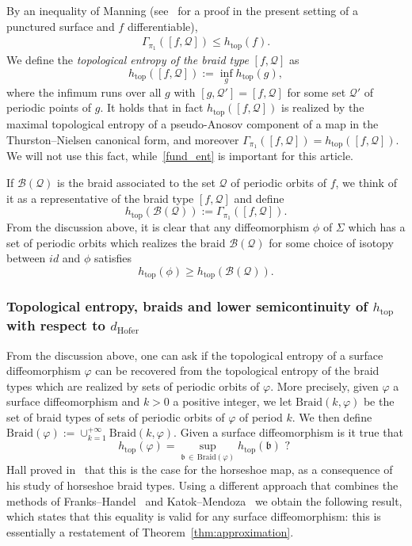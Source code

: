 \documentclass[AHL,Unicode,longabstracts,published]{cedram}
\newcommand{\id}{id}
\newcommand{\topo}{\mathrm{top}}
\newcommand{\hofer}{\mathrm{Hofer}}
\newcommand{\Braid}{\mathrm{Braid}}
\newcommand{\clB}{\mathcal{B}}
\newcommand{\clQ}{\mathcal{Q}}
\newcommand{\fkb}{\mathfrak{b}}
\newcommand{\topo}{\mathrm{top}}
\newcommand{\hofer}{\mathrm{Hofer}}
\begin{document}
By an inequality of Manning (see~\cite{Bowen} for a proof in the present setting of a punctured surface and $f$ differentiable),
\begin{align}\label{fund_ent}
\Gamma_{\pi_1}([f,\clQ]) \leq h_{\topo}(f).
\end{align}
We define the \emph{topological entropy of the braid type} $[f,\clQ]$ as
\[
h_{\topo}([f,\clQ]):= \inf_g h_{\topo}(g),
\]
where the infimum runs over all $g$ with $[g,\clQ'] = [f,\clQ]$ for some set $\clQ'$ of periodic points of $g$.
It holds that in fact $h_{\topo}([f,\clQ])$ is realized by the maximal topological entropy of a pseudo-Anosov component of a map in the Thurston--Nielsen canonical form, and moreover $\Gamma_{\pi_1}([f,\clQ]) = h_{\topo}([f,\clQ])$. We will not use this fact, while~\eqref{fund_ent} is important for this article.

If $\clB(\clQ)$ is the braid associated to the set $\clQ$ of periodic orbits of $f$, we think of it as a representative of the braid type $[f,\clQ]$ and define
\begin{equation}
h_{\topo}(\clB(\clQ)):=\Gamma_{\pi_1}([f,\clQ]).
\end{equation}
From the discussion above, it is clear that any diffeomorphism $\phi$ of $\Sigma$ which has a set of periodic orbits which realizes the braid $\clB(\clQ)$ for some choice of isotopy between $\id$ and $\phi$ satisfies
\begin{equation}
h_{\topo}(\phi) \geq h_{\topo}(\clB(\clQ)).
\end{equation}



\subsubsection{Topological entropy, braids and lower semicontinuity of \texorpdfstring{$h_{\topo}$}{h top} with respect to \texorpdfstring{$d_{\hofer}$}{d Hofer}}



From the discussion above, one can ask if the topological entropy of a surface diffeomorphism $\varphi$ can be recovered from the topological entropy of the braid types which are realized by sets of periodic orbits of $\varphi$. More precisely, given $\varphi$ a surface diffeomorphism and $k>0$ a positive integer, we let $\Braid(k,\varphi)$ be the set of braid types of sets of periodic orbits of $\varphi$ of period $k$. We then define $\Braid(\varphi):= \cup_{k=1}^{+\infty} \Braid(k,\varphi) $. Given a surface diffeomorphism is it true that
\begin{equation}
h_{\topo}(\varphi) = \sup_{\fkb\,\in\,\Braid(\varphi)} h_{\topo}(\fkb) \text{ ? }
\end{equation}
Hall proved in~\cite{Hall_horseshoe} that this is the case for the horseshoe map, as a consequence of his study of horseshoe braid types. Using a different approach that combines the methods of Franks--Handel~\cite{FranksHandel1988} and Katok--Mendoza~\cite{Hasselblatt-Katok} we obtain the following result, which states that this equality is valid for any surface diffeomorphism: this is essentially a restatement of Theorem~\ref{thm:approximation}.
\end{document}
